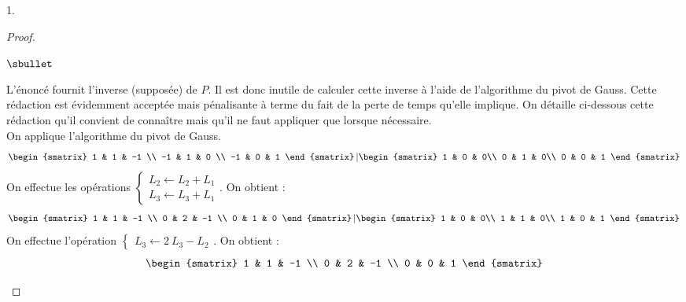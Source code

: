 \begin{noliste}{1.}
\begin{proof}
\begin{noliste}{$\sbullet$}
    \noindent
    ~\\[-1.5cm]
    \begin{remarkL}{.97}%
      L'énoncé fournit l'inverse (supposée) de $P$. Il est donc
      inutile de calculer cette inverse à l'aide de l'algorithme du
      pivot de Gauss. Cette rédaction est évidemment acceptée mais
      pénalisante à terme du fait de la perte de temps qu'elle
      implique. On détaille ci-dessous cette rédaction qu'il convient
      de connaître mais qu'il ne faut appliquer que lorsque
      nécessaire.\\[.2cm]
      On applique l'algorithme du pivot de Gauss.\\[-.1cm]
      \[
      \begin{smatrix}
        1 & 1 & -1 \\
        -1 & 1 & 0 \\
        -1 & 0 & 1
      \end{smatrix}
      \left\vert
        \begin{smatrix}
          1 & 0 & 0\\
          0 & 1 & 0\\
          0 & 0 & 1
        \end{smatrix}
      \right.
      \]
      On effectue les opérations $\left\{
        \begin{array}{l}
          L_2 \leftarrow L_2 + L_1\\
          L_3 \leftarrow L_3 + L_1
        \end{array}
      \right.$. On obtient :
      \[
      \begin{smatrix}
        1 & 1 & -1 \\
        0 & 2 & -1 \\
        0 & 1 & 0
      \end{smatrix}
      \left\vert
        \begin{smatrix}
          1 & 0 & 0\\
          1 & 1 & 0\\
          1 & 0 & 1
        \end{smatrix}
      \right.
      \]
      On effectue l'opération $\left\{
        \begin{array}{l}
          L_3 \leftarrow 2 \ L_3 - L_2
        \end{array}
      \right.$. On obtient :
      \[
      \begin{smatrix}
        1 & 1 & -1 \\
        0 & 2 & -1 \\
        0 & 0 & 1

\end{smatrix}\]
\end{remarkL}
\end{noliste}
\end{proof}
\end{noliste}
